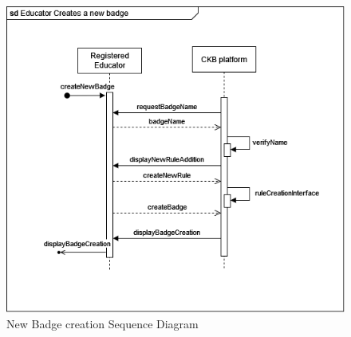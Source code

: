 \begin{center}
    \begin{figure} [H]
        \begin{center}
            \includegraphics[width=0.9\linewidth]{Images/SequenceDiagrams/SD_14.png}
            \caption{New Badge creation Sequence Diagram}
            \label{fig: badge_creation_seq_diag}
        \end{center}
    \end{figure}
\end{center}


